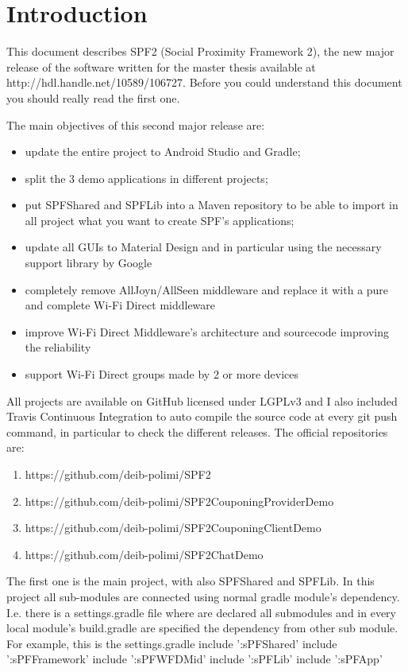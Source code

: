 \chapter{Introduction}
\label{Introduction}

This document describes SPF2 (Social Proximity Framework 2), the new major release of the software written for the master thesis available at http://hdl.handle.net/10589/106727. Before you could understand this document you should really read the first one.

The main objectives of this second major release are:
\begin{itemize}
	\item update the entire project to Android Studio and Gradle;
	\item split the 3 demo applications in different projects;
	\item put SPFShared and SPFLib into a Maven repository to be able to import in all project what you want to create SPF's applications;
	\item update all GUIs to Material Design and in particular using the necessary support library by Google
	\item completely remove AllJoyn/AllSeen middleware and replace it with a pure and complete Wi-Fi Direct middleware
	\item improve Wi-Fi Direct Middleware's architecture and sourcecode improving the reliability
	\item support Wi-Fi Direct groups made by 2 or more devices
\end{itemize}

All projects are available on GitHub licensed under LGPLv3 and I also included Travis Continuous Integration to auto compile the source code at every \textsf{git push} command, in particular to check the different releases.
The official repositories are:
\begin{enumerate}
	\item https://github.com/deib-polimi/SPF2
	\item https://github.com/deib-polimi/SPF2CouponingProviderDemo
	\item https://github.com/deib-polimi/SPF2CouponingClientDemo
	\item https://github.com/deib-polimi/SPF2ChatDemo
\end{enumerate}
The first one is the main project, with also SPFShared and SPFLib. In this project all sub-modules are connected using normal gradle module's dependency.
I.e. there is a settings.gradle file where are declared all submodules and
in every local module's build.gradle are specified the dependency from other sub module.
For example, this is the settings.gradle
include ':sPFShared'
include ':sPFFramework'
include ':sPFWFDMid'
include ':sPFLib'
include ':sPFApp'

